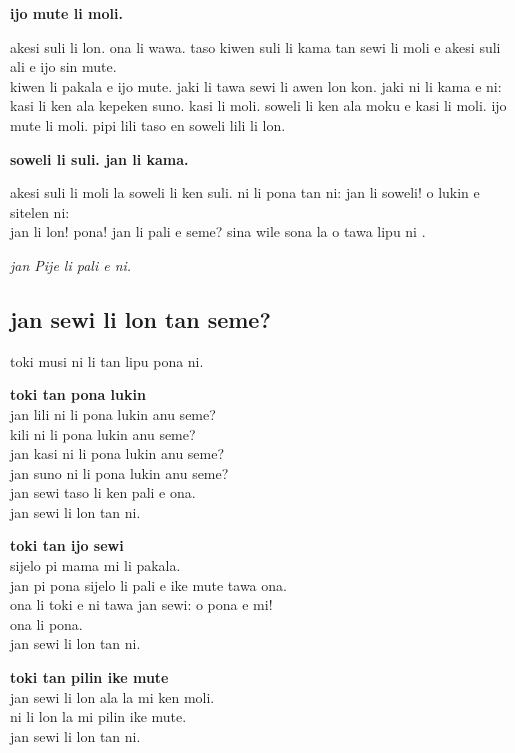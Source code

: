 \textbf{ijo mute li moli.}

akesi suli li lon. ona li wawa. taso kiwen suli li kama tan sewi li moli e akesi suli ali e ijo sin mute.  \\
kiwen li pakala e ijo mute. jaki li tawa sewi li awen lon kon. jaki ni li kama e ni: kasi li ken ala kepeken suno. kasi li moli. soweli li ken ala moku e kasi li moli. ijo mute li moli. pipi lili taso en soweli lili li lon.

\textbf{soweli li suli. jan li kama.}

akesi suli li moli la soweli li ken suli. ni li pona tan ni: jan li soweli! o lukin e sitelen ni:  \\
jan li lon! pona! jan li pali e seme? sina wile sona la o tawa lipu ni \cite{www:Pije:01}.

\textit{jan Pije li pali e ni. \cite{www:Pije:01}}
%
\newpage
\subsection{jan sewi li lon tan seme?}

toki musi ni li tan lipu pona ni.

\textbf{toki tan pona lukin}   \\
jan lili ni li pona lukin anu seme?   \\
kili ni li pona lukin anu seme?   \\
jan kasi ni li pona lukin anu seme?   \\
jan suno ni li pona lukin anu seme?   \\
jan sewi taso li ken pali e ona.   \\
jan sewi li lon tan ni.

\textbf{toki tan ijo sewi}   \\
sijelo pi mama mi li pakala.   \\
jan pi pona sijelo li pali e ike mute tawa ona.   \\
ona li toki e ni tawa jan sewi: o pona e mi!   \\
ona li pona.   \\
jan sewi li lon tan ni.

\textbf{toki tan pilin ike mute}   \\
jan sewi li lon ala la mi ken moli.   \\
ni li lon la mi pilin ike mute.   \\
jan sewi li lon tan ni.

